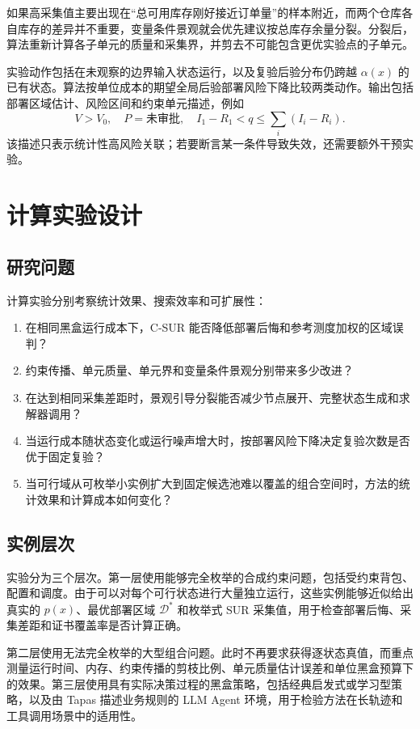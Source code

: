 \documentclass[UTF8,11pt,a4paper,fontset=none]{ctexart}
\newcommand{\D}{\mathcal D}
\newcommand{\1}{\mathbf 1}
\begin{document}
如果高采集值主要出现在“总可用库存刚好接近订单量”的样本附近，而两个仓库各自库存的差异并不重要，变量条件景观就会优先建议按总库存余量分裂。分裂后，算法重新计算各子单元的质量和采集界，并剪去不可能包含更优实验点的子单元。

实验动作包括在未观察的边界输入状态运行，以及复验后验分布仍跨越 $\alpha(x)$ 的已有状态。算法按单位成本的期望全局后验部署风险下降比较两类动作。输出包括部署区域估计、风险区间和约束单元描述，例如
\begin{equation}
  V>V_0,\quad P=\text{未审批},\quad
  I_1-R_1<q\leq\sum_i(I_i-R_i).
\end{equation}
该描述只表示统计性高风险关联；若要断言某一条件导致失效，还需要额外干预实验。

\section{计算实验设计}

\subsection{研究问题}

计算实验分别考察统计效果、搜索效率和可扩展性：
\begin{enumerate}
  \item 在相同黑盒运行成本下，C-SUR 能否降低部署后悔和参考测度加权的区域误判？
  \item 约束传播、单元质量、单元界和变量条件景观分别带来多少改进？
  \item 在达到相同采集差距时，景观引导分裂能否减少节点展开、完整状态生成和求解器调用？
  \item 当运行成本随状态变化或运行噪声增大时，按部署风险下降决定复验次数是否优于固定复验？
  \item 当可行域从可枚举小实例扩大到固定候选池难以覆盖的组合空间时，方法的统计效果和计算成本如何变化？
\end{enumerate}

\subsection{实例层次}

实验分为三个层次。第一层使用能够完全枚举的合成约束问题，包括受约束背包、配置和调度。由于可以对每个可行状态进行大量独立运行，这些实例能够近似给出真实的 $p(x)$、最优部署区域 $\D^*$ 和枚举式 SUR 采集值，用于检查部署后悔、采集差距和证书覆盖率是否计算正确。

第二层使用无法完全枚举的大型组合问题。此时不再要求获得逐状态真值，而重点测量运行时间、内存、约束传播的剪枝比例、单元质量估计误差和单位黑盒预算下的效果。第三层使用具有实际决策过程的黑盒策略，包括经典启发式或学习型策略，以及由 Tapas 描述业务规则的 LLM Agent 环境，用于检验方法在长轨迹和工具调用场景中的适用性。
\end{document}
